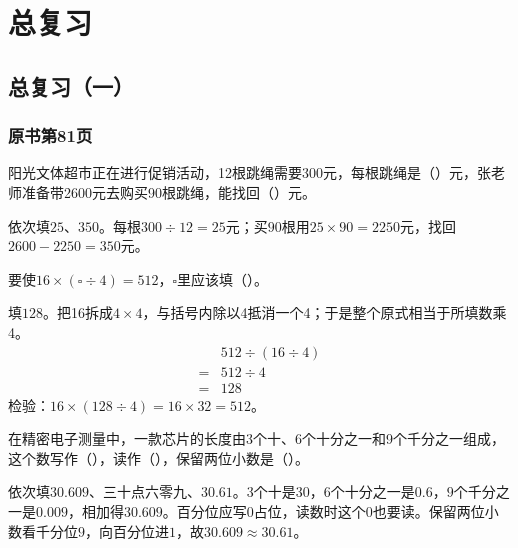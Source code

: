\chapter{总复习}


\section{总复习（一）}



\subsection*{原书第81页}

阳光文体超市正在进行促销活动，12根跳绳需要300元，每根跳绳是（\hspace{1.8em}）元，张老师准备带2600元去购买90根跳绳，能找回（\hspace{1.8em}）元。\par
\begin{BookAnswer}
依次填\(25\)、\(350\)。每根\(300\div12=25\)元；买\(90\)根用\(25\times90=2250\)元，找回\(2600-2250=350\)元。
\end{BookAnswer}

要使\(16\times(\square\div4)=512\)，\allowbreak{}\(\square\)里应该填（\hspace{1.8em}）。\par
\begin{BookAnswer}
填\(128\)。把16拆成\(4\times4\)，与括号内除以4抵消一个4；于是整个原式相当于所填数乘4。\[\begin{aligned}&512\div(16\div4)\\={}&512\div4\\={}&128\end{aligned}\]检验：\(16\times(128\div4)=16\times32=512\)。
\end{BookAnswer}

在精密电子测量中，一款芯片的长度由3个十、6个十分之一和9个千分之一组成，这个数写作（\hspace{1.8em}），读作（\hspace{1.8em}），保留两位小数是（\hspace{1.8em}）。\par
\begin{BookAnswer}
依次填\(30.609\)、三十点六零九、\(30.61\)。\(3\)个十是\(30\)，\allowbreak{}\(6\)个十分之一是\(0.6\)，\allowbreak{}\(9\)个千分之一是\(0.009\)，相加得\(30.609\)。百分位应写\(0\)占位，读数时这个\(0\)也要读。保留两位小数看千分位\(9\)，向百分位进\(1\)，故\(30.609\approx30.61\)。
\end{BookAnswer}

